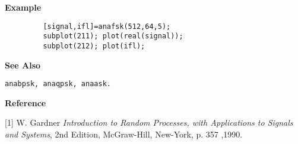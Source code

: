 {\bf \large \sf Example}
\begin{verbatim}
         [signal,ifl]=anafsk(512,64,5); 
         subplot(211); plot(real(signal)); 
         subplot(212); plot(ifl);
\end{verbatim}
\vspace*{.5cm}


{\bf \large \sf See Also}\\
\hspace*{1.5cm}
\begin{minipage}[t]{13.5cm}
\begin{verbatim}
anabpsk, anaqpsk, anaask.
\end{verbatim}
\end{minipage}
\vspace*{.5cm}


{\bf \large \sf Reference}\\
\hspace*{1.5cm}
\begin{minipage}[t]{13.5cm}
[1] W. Gardner {\it Introduction to Random Processes, with Applications to
Signals and Systems}, 2nd Edition, McGraw-Hill, New-York, p. 357 ,1990.  
\end{minipage}
